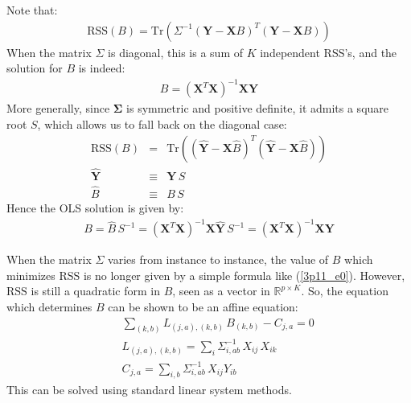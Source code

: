 


Note that:
\begin{eqnarray*}
    \textrm{RSS}(B) = \textrm{Tr} \left(\Sigma^{-1} \left( \mathbf{Y} - \mathbf{X} B \right)^T \left( \mathbf{Y} - \mathbf{X} B \right)\right)
\end{eqnarray*}
When the matrix $\Sigma$ is diagonal, this is a sum of $K$ independent RSS's, and the solution for
$B$ is indeed:
\begin{eqnarray} \label{3p11_e0}
B = \left( \mathbf{X} ^T \mathbf{X} \right)^{-1} \mathbf{X} \mathbf{Y}
\end{eqnarray}
More generally, since $\mathbf{\Sigma}$ is symmetric and positive definite, it admits a square root $S$, which allows us to fall back on the diagonal case:
\begin{eqnarray*}
    \textrm{RSS}(B) & = & \textrm{Tr} \left(\left( \mathbf{\hat{Y}} - \mathbf{X} \hat{B} \right)^T \left( \mathbf{\hat{Y}} - \mathbf{X} \hat{B} \right)\right)\\
    \mathbf{\hat{Y}} & \equiv &\mathbf{Y}\,S\\
    \hat{B} & \equiv & B\, S
\end{eqnarray*}
Hence the OLS solution is given by:
\begin{eqnarray*}
    B = \hat{B}\, S^{-1} = \left( \mathbf{X} ^T \mathbf{X} \right)^{-1} \mathbf{X} \hat{\mathbf{Y}} \, S^{-1} = \left( \mathbf{X} ^T \mathbf{X} \right)^{-1} \mathbf{X} \mathbf{Y}
\end{eqnarray*}

When the matrix $\Sigma$ varies from instance to instance, the value of $B$ which minimizes $\textrm{RSS}$
is no longer given by a simple formula like (\ref{3p11_e0}). However, $\textrm{RSS}$ is still a quadratic
form in $B$, seen as a vector in $\mathbb{R}^{p \times K}$. So, the equation which determines $B$ 
can be shown to be an affine equation:
\begin{eqnarray*}
    && \sum_{(k, b)} L_{(j, a), (k, b)} \, B_{(k, b)} - C_{j, a} = 0\\
    && L_{(j, a), (k, b)} = \sum_i \Sigma^{-1}_{i, ab} \, X_{ij}\, X_{ik}\\
    && C_{j, a} = \sum_{i, b} \Sigma^{-1}_{i, ab} \, X_{ij} Y_{ib}
\end{eqnarray*}
This can be solved using standard linear system methods.